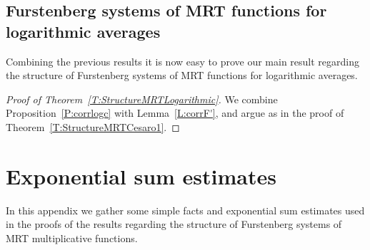 \documentclass[11pt]{amsart}
\newtheorem{lemma}{Lemma}[section]
\theoremstyle{definition}
\newtheorem*{remark}{Remark}
\newcommand{\E}{{\mathbb E}}
\newcommand{\N}{{\mathbb N}}
\newcommand{\U}{{\mathbb U}}
\begin{document}
	 			 \subsection{Furstenberg systems  of MRT functions for logarithmic  averages}
	 			 Combining the previous results it is now easy to prove our main result regarding the structure of Furstenberg systems of MRT functions for logarithmic averages.
	 \begin{proof}[Proof of Theorem~\ref{T:StructureMRTLogarithmic}]
	 		We combine    Proposition~\ref{P:corrlogc} with  Lemma~\ref{L:corrF'}, and argue
 as in the proof of Theorem~\ref{T:StructureMRTCesaro1}.
\end{proof}
 	
 	
 	
 	 		



 \appendix


 \section{Exponential sum estimates}\label{A:estimates}
In  this appendix we  gather some simple facts and exponential sum estimates used in the proofs of the results regarding the structure of Furstenberg systems of MRT multiplicative functions.
\end{document}
